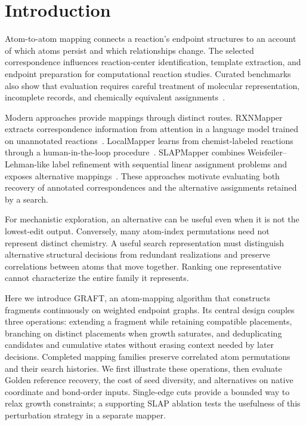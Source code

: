 \section{Introduction}

Atom-to-atom mapping connects a reaction's endpoint structures to an account of which atoms persist and which relationships change. The selected correspondence influences reaction-center identification, template extraction, and endpoint preparation for computational reaction studies. Curated benchmarks also show that evaluation requires careful treatment of molecular representation, incomplete records, and chemically equivalent assignments~\citep{lin2022}.

Modern approaches provide mappings through distinct routes. RXNMapper extracts correspondence information from attention in a language model trained on unannotated reactions~\citep{schwaller2021}. LocalMapper learns from chemist-labeled reactions through a human-in-the-loop procedure~\citep{chen2024}. SLAPMapper combines Weisfeiler--Lehman-like label refinement with sequential linear assignment problems and exposes alternative mappings~\citep{koda2025}. These approaches motivate evaluating both recovery of annotated correspondences and the alternative assignments retained by a search.

For mechanistic exploration, an alternative can be useful even when it is not the lowest-edit output. Conversely, many atom-index permutations need not represent distinct chemistry. A useful search representation must distinguish alternative structural decisions from redundant realizations and preserve correlations between atoms that move together. Ranking one representative cannot characterize the entire family it represents.

Here we introduce GRAFT, an atom-mapping algorithm that constructs fragments continuously on weighted endpoint graphs. Its central design couples three operations: extending a fragment while retaining compatible placements, branching on distinct placements when growth saturates, and deduplicating candidates and cumulative states without erasing context needed by later decisions. Completed mapping families preserve correlated atom permutations and their search histories. We first illustrate these operations, then evaluate Golden reference recovery, the cost of seed diversity, and alternatives on native coordinate and bond-order inputs. Single-edge cuts provide a bounded way to relax growth constraints; a supporting SLAP ablation tests the usefulness of this perturbation strategy in a separate mapper.

